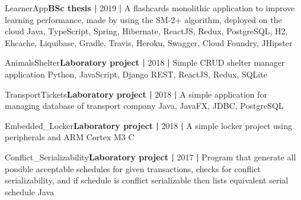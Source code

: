 

\begin{projects}
	\project
	{LearnerApp}{\textbf{BSc thesis |} 2019 \textbf{|}}
	{}
	{A flashcards monolithic application to improve learning performance, made by using the SM-2+ algorithm, deployed on the cloud}
	{Java, TypeScript, Spring, Hibernate, ReactJS, Redux, PostgreSQL, H2, Ehcache, Liquibase, Gradle, Travis, Heroku, Swagger, Cloud Foundry, JHipster}
	
	\project
	{AnimalsShelter}{\textbf{Laboratory project |} 2018 \textbf{|}}
	{}
	{Simple CRUD shelter manager application}
	{Python, JavaScript, Django REST, ReactJS, Redux, SQLite}
	
	\project
	{TransportTickets}{\textbf{Laboratory project |} 2018 \textbf{|}}
	{}
	{A simple application for managing database of transport company}
	{Java, JavaFX, JDBC, PostgreSQL}
	
	\project
	{Embedded\_Locker}{\textbf{Laboratory project |} 2018 \textbf{|}}
	{}
	{A simple locker project using peripherals and ARM Cortex M3}
	{C}
	
	\project
	{Conflict\_Serializability}{\textbf{Laboratory project |} 2017 \textbf{|}}
	{}
	{Program that generate all possible acceptable schedules for given transactions, checks for conflict serializability, and if schedule is conflict serializable then lists equivalent serial schedule}
	{Java}
\end{projects}